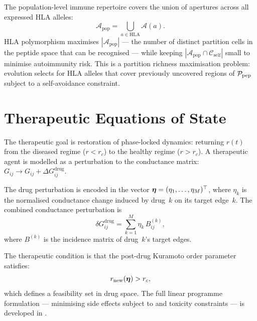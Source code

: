 The population-level immune repertoire covers the union of apertures across
all expressed HLA alleles:
\begin{equation}
  \mathcal{A}_{\mathrm{pop}}
  = \bigcup_{a \in \mathrm{HLA}} \mathcal{A}(a).
  \label{eq:pop-aperture}
\end{equation}
HLA polymorphism maximises $|\mathcal{A}_{\mathrm{pop}}|$ — the number of
distinct partition cells in the peptide space that can be recognised — while
keeping $|\mathcal{A}_{\mathrm{pop}} \cap \mathcal{C}_{\mathrm{self}}|$ small
to minimise autoimmunity risk.  This is a partition richness maximisation
problem: evolution selects for HLA alleles that cover previously uncovered
regions of $\mathcal{P}_{\mathrm{pep}}$ subject to a self-avoidance constraint.

\section{Therapeutic Equations of State}
\label{sec:therapeutic-eqs-state}

The therapeutic goal is restoration of phase-locked dynamics: returning
$r(t)$ from the diseased regime ($r < r_c$) to the healthy regime ($r > r_c$).
A therapeutic agent is modelled as a perturbation to the conductance matrix:
$G_{ij} \to G_{ij} + \Delta G_{ij}^{\mathrm{drug}}$.

\begin{definition}
\label{def:drug-vector}
The drug perturbation is encoded in the vector
$\boldsymbol{\eta} = (\eta_1, \ldots, \eta_M)^\top$, where $\eta_k$ is the
normalised conductance change induced by drug~$k$ on its target edge~$k$.
The combined conductance perturbation is
\begin{equation}
  \delta G_{ij}^{\mathrm{drug}}
  = \sum_{k=1}^{M} \eta_k\, B_{ij}^{(k)},
  \label{eq:drug-perturbation}
\end{equation}
where $B^{(k)}$ is the incidence matrix of drug~$k$'s target edges.
\end{definition}

The therapeutic condition is that the post-drug Kuramoto order parameter
satisfies:
\begin{equation}
  r_{\mathrm{new}}(\boldsymbol{\eta}) > r_c,
  \label{eq:therapeutic-condition}
\end{equation}
which defines a feasibility set in drug space.  The full linear programme
formulation — minimising side effects subject to 
and toxicity constraints — is developed in .

